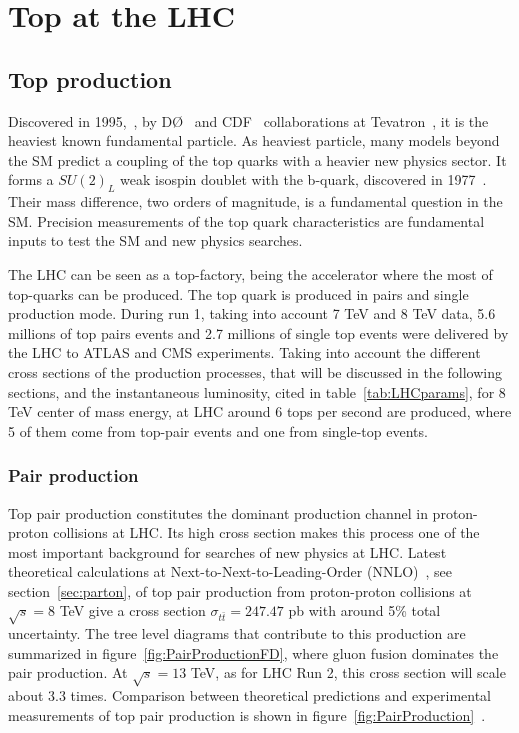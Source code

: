 \section{Top at the LHC}
\subsection{Top production}

Discovered in 1995,~\cite{Abe:1995hr, Abachi:1995iq}, by D\O~\cite{Abazov:2002su} and CDF~\cite{Blair:1996kx} collaborations at Tevatron~\cite{Group:1984bk}, it is the heaviest known fundamental particle. As heaviest particle, many models beyond the SM predict a coupling of the top quarks with a heavier new physics sector. It forms a $SU(2)_{L}$ weak isospin doublet with the b-quark, discovered in 1977~\cite{Herb:1977ek}. Their mass difference, two orders of magnitude, is a fundamental question in the SM. Precision measurements of the top quark characteristics are fundamental inputs to test the SM and new physics searches.

The LHC can be seen as a top-factory, being the accelerator where the most of top-quarks can be produced. The top quark is produced in pairs and single production mode. During run 1, taking into account 7 TeV and 8 TeV data, 5.6 millions of top pairs events and 2.7 millions of single top events were delivered by the LHC to ATLAS and CMS experiments. Taking into account the different cross sections of the production processes, that will be discussed in the following sections, and the instantaneous luminosity, cited in table~\ref{tab:LHCparams}, for 8 TeV center of mass energy, at LHC around 6 tops per second are produced, where 5 of them come from top-pair events and one from single-top events.  

\subsubsection{Pair production}
\label{subsec:toppair}

Top pair production constitutes the dominant production channel in proton-proton collisions at LHC. Its high cross section makes this process one of the most important background for searches of new physics at LHC. Latest theoretical calculations at Next-to-Next-to-Leading-Order (NNLO)~\cite{Czakon:2013goa}, see section~\ref{sec:parton}, of top pair production from proton-proton collisions at $\sqrt{s}=8$ TeV give a cross section $\sigma_{t\bar{t}}=247.47$ pb with around 5\% total uncertainty. The tree level diagrams that contribute to this production are summarized in figure~\ref{fig:PairProductionFD}, where gluon fusion dominates the pair production. At $\sqrt{s}=13$ TeV, as for LHC Run 2, this cross section will scale about 3.3 times. Comparison between theoretical predictions and experimental measurements of top pair production is shown in figure~\ref{fig:PairProduction}~\cite{TOPLHCWG}.


